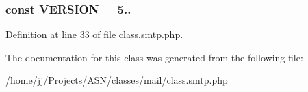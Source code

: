 \subsubsection[{\texorpdfstring{V\+E\+R\+S\+I\+ON}{VERSION}}]{\setlength{\rightskip}{0pt plus 5cm}const V\+E\+R\+S\+I\+ON = \textquotesingle{}5..\textquotesingle{}}\hypertarget{class_s_m_t_p_af71005841ce53adac00581ab0ba24c1f}{}\label{class_s_m_t_p_af71005841ce53adac00581ab0ba24c1f}


Definition at line 33 of file class.\+smtp.\+php.



The documentation for this class was generated from the following file\+:\begin{DoxyCompactItemize}
\item 
/home/jj/\+Projects/\+A\+S\+N/classes/mail/\hyperlink{class_8smtp_8php}{class.\+smtp.\+php}\end{DoxyCompactItemize}
